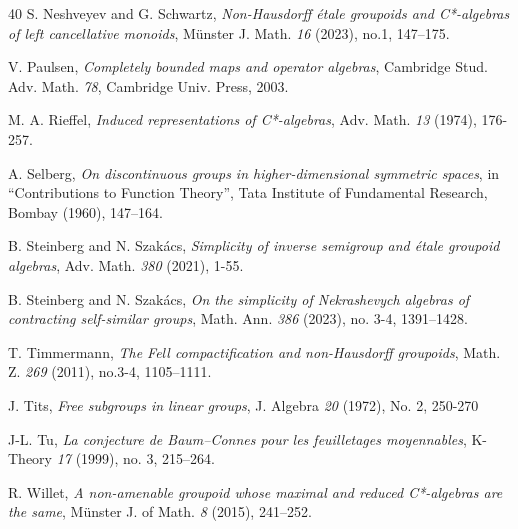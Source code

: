 \documentclass[a4paper, 12pt]{amsart}
\theoremstyle{definition}
\theoremstyle{remark}
\numberwithin{equation}{section}
\begin{document}
\begin{thebibliography}{40}
     S. Neshveyev and G. Schwartz, \emph{Non-Hausdorff \'etale groupoids and C*-algebras of left cancellative monoids}, Münster J. Math. \emph{16} (2023), no.1, 147–175.
    
     V. Paulsen, \emph{Completely bounded maps and operator algebras}, Cambridge Stud. Adv. Math. \emph{78}, Cambridge Univ. Press, 2003.
    
     M. A. Rieffel, \emph{Induced representations of C*-algebras}, Adv. Math. \emph{13} (1974), 176-257.

     A. Selberg, \emph{On discontinuous groups in higher-dimensional symmetric spaces}, in “Contributions to
Function Theory”, Tata Institute of Fundamental Research, Bombay (1960), 147–164.

     B. Steinberg and N. Szak\'acs, \emph{Simplicity of inverse semigroup and \'etale groupoid algebras}, Adv. Math. \emph{380} (2021), 1-55.

     B. Steinberg and N. Szak\'acs, \emph{On the simplicity of Nekrashevych algebras of contracting self-similar groups}, Math. Ann. \emph{386} (2023), no. 3-4, 1391–1428.
    
     T. Timmermann, \emph{The Fell compactification and non-Hausdorff groupoids}, Math. Z. \emph{269} (2011), no.3-4, 1105–1111.

     J. Tits, \emph{Free subgroups in linear groups}, J. Algebra \emph{20} (1972), No. 2, 250-270

      J-L. Tu, \emph{La conjecture de Baum–Connes pour les feuilletages moyennables}, K-Theory \emph{17} (1999), no. 3, 215–264.
    
     R. Willet, \emph{A non-amenable groupoid whose maximal and reduced C*-algebras are the same}, Münster J. of Math. \emph{8} (2015), 241–252.
\end{thebibliography}
\end{document}
